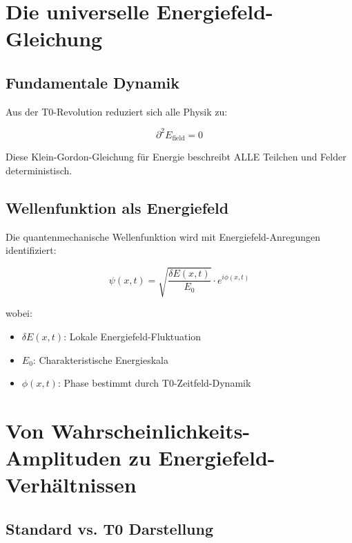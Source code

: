 \documentclass[12pt,a4paper]{report}
\begin{document}
\section{Die universelle Energiefeld-Gleichung}
\label{sec:universal_field_equation}

\subsection{Fundamentale Dynamik}
\label{subsec:fundamental_dynamics}

Aus der T0-Revolution reduziert sich alle Physik zu:

\begin{equation}
	\boxed{\partial^2 E_{\text{field}} = 0}
	\label{eq:universal_field_equation}
\end{equation}

Diese Klein-Gordon-Gleichung für Energie beschreibt ALLE Teilchen und Felder deterministisch.

\subsection{Wellenfunktion als Energiefeld}
\label{subsec:wave_function_energy_field}

Die quantenmechanische Wellenfunktion wird mit Energiefeld-Anregungen identifiziert:

\begin{equation}
	\psi(x,t) = \sqrt{\frac{\delta E(x,t)}{E_0}} \cdot e^{i\phi(x,t)}
	\label{eq:wave_function_energy}
\end{equation}

wobei:
\begin{itemize}
	\item $\delta E(x,t)$: Lokale Energiefeld-Fluktuation
	\item $E_0$: Charakteristische Energieskala
	\item $\phi(x,t)$: Phase bestimmt durch T0-Zeitfeld-Dynamik
\end{itemize}

\section{Von Wahrscheinlichkeits-Amplituden zu Energiefeld-Verhältnissen}
\label{sec:amplitudes_to_ratios}

\subsection{Standard vs. T0 Darstellung}
\label{subsec:standard_vs_t0}
\end{document}
